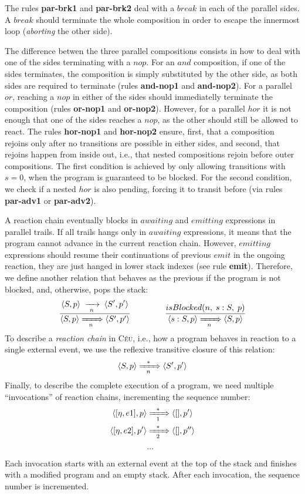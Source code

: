 \documentclass{acm_proc_article-sp}
\newcommand{\CEU}{\textsc{C\'{e}u}\xspace}
\newcommand{\ST}{\1\xrightarrow[~n~]{}\1}
\newcommand{\LL}{\langle}
\newcommand{\RR}{\rangle}
\newcommand{\DS}{\displaystyle}
\newcommand{\rr}[1] {{\textbf{\scriptsize{#1}}}}
\newcommand{\1}{\;}
\newcommand{\2}{\;\;}
\newcommand{\3}{\;\;\;}
\newcommand{\5}{\;\;\;\;\;}
\begin{document}
The rules \rr{par-brk1} and \rr{par-brk2} deal with a $break$ in each of the 
parallel sides.
A $break$ should terminate the whole composition in order to escape the 
innermost loop (\emph{aborting} the other side).

The difference betwen the three parallel compositions consists in how to deal 
with one of the sides terminating with a $nop$.
%
For an $and$ composition, if one of the sides terminates, the composition is 
simply substituted by the other side, as both sides are required to terminate 
(rules \rr{and-nop1} and \rr{and-nop2}).
%
For a parallel $or$, reaching a $nop$ in either of the sides should 
immediatelly terminate the composition (rules \rr{or-nop1} and \rr{or-nop2}).
%
However, for a parallel $hor$ it is not enough that one of the sides reaches a 
$nop$, as the other should still be allowed to react.
The rules \rr{hor-nop1} and \rr{hor-nop2} ensure, first, that a composition 
rejoins only after no transitions are possible in either sides, and second, 
that rejoins happen from inside out, i.e., that nested compositions rejoin 
before outer compositions.
The first condition is achieved by only allowing transitions with $s=0$, when 
the program is guaranteed to be blocked.
For the second condition, we check if a nested $hor$ is also pending, forcing 
it to transit before (via rules \rr{par-adv1} or \rr{par-adv2}).

A reaction chain eventually blocks in $awaiting$ and $emitting$ expressions in 
parallel trails.
%
If all trails hangs only in $awaiting$ expressions, it means that the program 
cannot advance in the current reaction chain.
%
However, $emitting$ expressions should resume their continuations of previous 
$emit$ in the ongoing reaction, they are just hanged in lower stack indexes 
(see rule \textbf{emit}).
%
Therefore, we define another relation that behaves as the previous if the 
program is not blocked, and, otherwise, pops the stack:
%
$$
\frac
    { \DS \LL S,p \RR \ST                   \LL S',p' \RR }
    {     \LL S,p \RR \xRightarrow[~~n~~]{} \LL S',p' \RR }
%
\5\5\5
%
\frac
    { \DS isBlocked(n,\1s:S,\1p) }
    { \LL s:S,p \RR \xRightarrow[~~n~~]{} \LL S,p \RR }
$$
%
To describe a \emph{reaction chain} in \CEU, i.e., how a program behaves in 
reaction to a single external event, we use the reflexive transitive closure of 
this relation:
%
$$
    \LL S,p \RR \xRightarrow[~~n~~]{*} \LL S',p' \RR
$$
%
Finally, to describe the complete execution of a program, we need multiple 
``invocations'' of reaction chains, incrementing the sequence number:
%
\begin{align*}
\LL [\eta,e1], p \RR
    & \xRightarrow[~~1~~]{*}
\LL [  ], p' \RR
\\
\LL [\eta,e2], p' \RR
    & \xRightarrow[~~2~~]{*}
\LL [  ], p'' \RR
\\
& ...
\end{align*}
%
Each invocation starts with an external event at the top of the stack and 
finishes with a modified program and an empty stack.
After each invocation, the sequence number is incremented.
\end{document}
